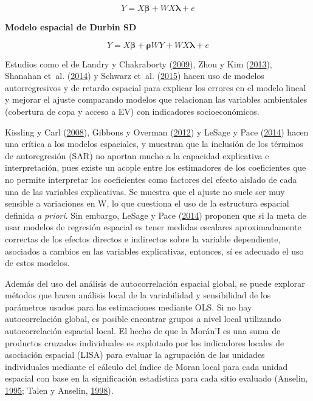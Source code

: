 \documentclass[12pt,a4paper,oneside, openany]{book}
\theoremstyle{definition}
\theoremstyle{definition}
\theoremstyle{definition}
\theoremstyle{remark}
\begin{document}
\begin{equation}
Y=X\mathbf{\beta}+WX\mathbf{\lambda}+e
\label{eq:slx}
\end{equation}

\textbf{Modelo espacial de Durbin SD}

\begin{equation}
Y=X\mathbf{\beta}+\mathbf{\rho}WY+WX\mathbf{\lambda}+e
\label{eq:sd}
\end{equation}

Estudios como el de Landry y Chakraborty
(\protect\hyperlink{ref-landry_street_2009}{2009}), Zhou y Kim
(\protect\hyperlink{ref-zhou_social_2013}{2013}), Shanahan et~al.
(\protect\hyperlink{ref-shanahan_socio-economic_2014}{2014}) y Schwarz
et~al. (\protect\hyperlink{ref-schwarz_trees_2015}{2015}) hacen uso de
modelos autorregresivos y de retardo espacial para explicar los errores
en el modelo lineal y mejorar el ajuste comparando modelos que
relacionan las variables ambientales (cobertura de copa y acceso a EV)
con indicadores socioeconómicos.

Kissling y Carl (\protect\hyperlink{ref-kissling_spatial_2008}{2008}),
Gibbons y Overman (\protect\hyperlink{ref-gibbons_mostly_2012}{2012}) y
LeSage y Pace (\protect\hyperlink{ref-lesage_biggest_2014}{2014}) hacen
una crítica a los modelos espaciales, y muestran que la inclusión de los
términos de autoregresión (SAR) no aportan mucho a la capacidad
explicativa e interpretación, pues existe un acople entre los
estimadores de los coeficientes que no permite interpretar los
coeficientes como factores del efecto aislado de cada una de las
variables explicativas. Se muestra que el ajuste no suele ser muy
sensible a variaciones en W, lo que cuestiona el uso de la estructura
espacial definida \emph{a priori}. Sin embargo, LeSage y Pace
(\protect\hyperlink{ref-lesage_biggest_2014}{2014}) proponen que si la
meta de usar modelos de regresión espacial es tener medidas escalares
aproximadamente correctas de los efectos directos e indirectos sobre la
variable dependiente, asociados a cambios en las variables explicativas,
entonces, sí es adecuado el uso de estos modelos.

Además del uso del análisis de autocorrelación espacial global, se puede
explorar métodos que hacen análisis local de la variabilidad y
sensibilidad de los parámetros usados para las estimaciones mediante
OLS. Si no hay autocorrelación global, es posible encontrar grupos a
nivel local utilizando autocorrelación espacial local. El hecho de que
la Morán'I es una suma de productos cruzados individuales es explotado
por los indicadores locales de asociación espacial (LISA) para evaluar
la agrupación de las unidades individuales mediante el cálculo del
índice de Moran local para cada unidad espacial con base en la
significación estadística para cada sitio evaluado (Anselin,
\protect\hyperlink{ref-anselin1995local}{1995}; Talen y Anselin,
\protect\hyperlink{ref-talen_assessing_1998}{1998}).
\end{document}
